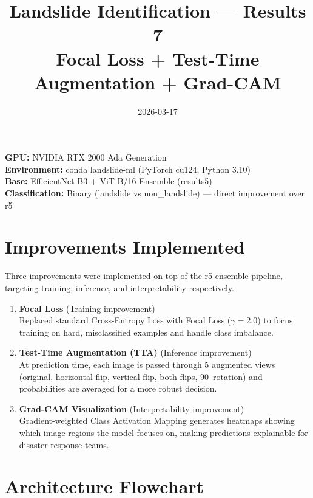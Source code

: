 \documentclass[11pt]{article}
\title{Landslide Identification --- Results 7 \\ \large Focal Loss + Test-Time Augmentation + Grad-CAM}
\author{}
\date{2026-03-17}
\begin{document}
\maketitle

\noindent\textbf{GPU:} NVIDIA RTX 2000 Ada Generation \\
\textbf{Environment:} conda landslide-ml (PyTorch cu124, Python 3.10) \\
\textbf{Base:} EfficientNet-B3 + ViT-B/16 Ensemble (results5) \\
\textbf{Classification:} Binary (landslide vs non\_landslide) --- direct improvement over r5

\section{Improvements Implemented}

Three improvements were implemented on top of the r5 ensemble pipeline, targeting training, inference, and interpretability respectively.

\begin{enumerate}
    \item \textbf{Focal Loss} (Training improvement) \\
          Replaced standard Cross-Entropy Loss with Focal Loss ($\gamma = 2.0$) to focus training on hard, misclassified examples and handle class imbalance.

    \item \textbf{Test-Time Augmentation (TTA)} (Inference improvement) \\
          At prediction time, each image is passed through 5 augmented views (original, horizontal flip, vertical flip, both flips, 90\textdegree\ rotation) and probabilities are averaged for a more robust decision.

    \item \textbf{Grad-CAM Visualization} (Interpretability improvement) \\
          Gradient-weighted Class Activation Mapping generates heatmaps showing which image regions the model focuses on, making predictions explainable for disaster response teams.
\end{enumerate}

\section{Architecture Flowchart}
\end{document}
